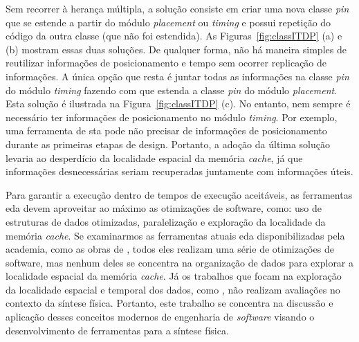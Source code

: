 Sem recorrer à herança múltipla, a solução consiste em criar uma nova classe \textit{pin} que se estende a partir do módulo \textit{placement} ou \textit{timing} e possui repetição do código da outra classe (que não foi estendida). As Figuras~\ref{fig:classITDP} (a) e (b) mostram essas duas soluções. De qualquer forma, não há maneira simples de reutilizar informações de posicionamento e tempo sem ocorrer replicação de informações. A única opção que resta é juntar todas as informações na classe \textit{pin} do módulo \textit{timing} fazendo com que estenda a classe \textit{pin} do módulo \textit{placement}. Esta solução é ilustrada na Figura~\ref{fig:classITDP} (c). No entanto, nem sempre é necessário ter informações de posicionamento no módulo \textit{timing}. Por exemplo, uma ferramenta de \ac{sta} pode não precisar de informações de posicionamento durante as primeiras etapas de design. Portanto, a adoção da última solução levaria ao desperdício da localidade espacial da memória \textit{cache}, já que informações desnecessárias seriam recuperadas juntamente com informações úteis.





Para garantir a execução dentro de tempos de execução aceitáveis, as ferramentas \ac{eda} devem aproveitar ao máximo as otimizações de software, como: uso de estruturas de dados otimizadas, paralelização e exploração da localidade da memória \textit{cache}.
Se examinarmos as ferramentas atuais \ac{eda} disponibilizadas pela academia, como as obras de \cite{universityOfMichigan, kahng2014horizontal, jung2016opendesign, flach2017rsyn, openAccess}, todos eles realizam uma série de otimizações de software, mas nenhum deles se concentra na organização de dados para explorar a localidade espacial da memória \textit{cache}.
Já os trabalhos que focam na exploração da localidade espacial e temporal dos dados, como \cite{li2014, Tang2015, qasem2017characterizing}, não realizam avaliações no contexto da síntese física.
Portanto, este trabalho se concentra na discussão e aplicação desses conceitos modernos de engenharia de  \textit{software} visando o desenvolvimento de ferramentas para a síntese física.

